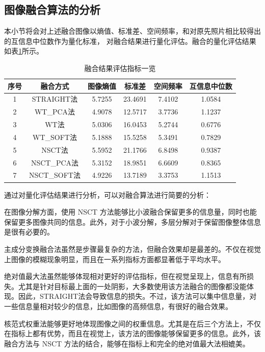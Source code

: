 \documentclass{xduugthesis}
\begin{document}
\subsection{图像融合算法的分析}
本小节将会对上述融合图像以熵值、标准差、空间频率，和对原先照片相比较得出的互信息中位数作为量化标准，
对融合结果进行量化评估。融合的量化评估结果如表\ref{simulation_fusion_result}所示。
\begin{table}[ht!]
	\caption{融合结果评估指标一览}\label{simulation_fusion_result}
	\begin{tabular}{|c|c|c|c|c|c|}
		\hline
		序号 & 融合方式 & 图像熵值 & 标准差 & 空间频率 & 互信息中位数 \\
		\hline
		1 & STRAIGHT法 & 5.7255 & 23.4691 & 7.4102 & 1.0584  \\
		\hline
		2 & WT\_PCA法 & 4.9078 & 12.5717 & 3.7736 & 1.1237  \\
		\hline
		3 & WT法 & 5.0306 & 16.0453 & 5.2744 & 0.6776 \\
		\hline
		4 & WT\_SOFT法 & 5.1888 & 15.5258 & 5.3491 & 0.7829  \\
		\hline
		5 & NSCT法 & 5.5952 & 21.1766 & 6.8498 & 0.9387 \\
		\hline
		6 & NSCT\_PCA法 & 5.3152 & 18.9851 & 6.6609 & 0.8365 \\
		\hline
		7 & NSCT\_SOFT法 & 4.9226 & 13.7189 & 3.3753 & 1.1513 \\
		\hline
	\end{tabular}
\end{table}
\vspace{-1em} \par
通过对量化评估结果进行分析，可以对融合算法进行简要的分析：\par
\begin{enumerate*}[itemjoin=\\\hspace*{\parindent}]
	\item 在图像分解方面，使用 NSCT 方法能够比小波融合保留更多的信息量，同时也能保留更多图像共同的信息。此外，对于小波分解，多层分解对于保留图像整体信息是很有必要的。
	\item 主成分变换融合法虽然是步骤最复杂的方法，但融合效果却是最差的。不仅在视觉上图像的模糊现象明显，而且在一系列指标方面都显著低于平均水平。
	\item 绝对值最大法虽然能够体现相对更好的评估指标，但在视觉呈现上，信息有所损失。尤其是针对目标最上面的一处阴影，大多数使用该方法融合的图像都没能体现。因此，STRAIGHT法会导致信息的损失。不过，该方法可以集中信息量，对一些信息量相对较少的信息，比如图像的高频信息，有很好的融合效果。
	\item 核范式权重法能够更好地体现图像之间的权重信息。尤其是在后三个方法上，不仅在指标上都有优势，而且在视觉上，该方法的图像能够保留更多的信息。此外，该融合方法与 NSCT 方法的结合，能够在指标上和完全的绝对值最大法相媲美。
\end{enumerate*}
\end{document}
